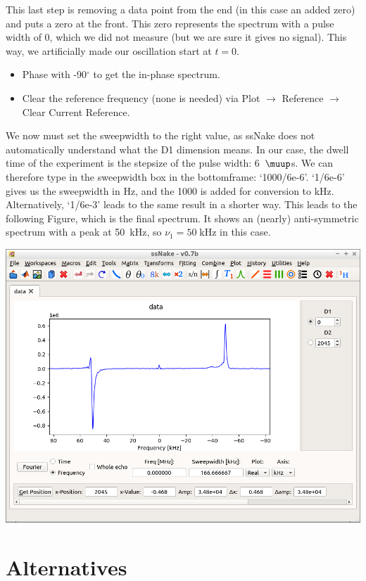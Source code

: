 \documentclass[11pt,a4paper]{article}
\begin{document}
This last step is removing a data point from the end (in this case an added zero) and puts a zero at the front. This zero represents the spectrum with a pulse width of 0, which we did not measure (but we are sure it gives no signal). This way, we artificially made our oscillation start at $t=0$. 

\begin{itemize}
\item Phase with -90$^\circ$ to get the in-phase spectrum.
\item Clear the reference frequency (none is needed) via Plot $\longrightarrow$ Reference $\longrightarrow$ Clear Current Reference.
\end{itemize}
We now must set the sweepwidth to the right value, as ssNake does not automatically understand what the D1 dimension means. In our case, the dwell time of the experiment is the stepsize of the pulse width: 6~$\muup$s. We can therefore type in the sweepwidth box in the bottomframe: `1000/6e-6'. `1/6e-6' gives us the sweepwidth in Hz, and the 1000 is added for conversion to kHz. Alternatively, `1/6e-3' leads to the same result in a shorter way. This leads to the following Figure, which is the final spectrum. It shows an (nearly) anti-symmetric spectrum with a peak at 50~kHz, so $\nu_1 = 50\;$kHz in this case.
\begin{center}
\includegraphics[width=0.8\linewidth]{Figs/Fig4.png}
\end{center}

\section{Alternatives}
\end{document}
